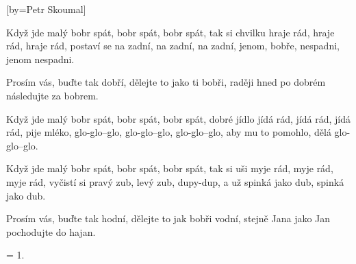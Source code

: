 [by={Petr Skoumal}]

\beginverse{}
Když jde malý bobr spát, bobr spát, bobr spát,
tak si chvilku hraje rád, hraje rád, hraje rád,
postaví se na zadní, na zadní, na zadní,
jenom, bobře, nespadni, jenom nespadni.
\endverse{}

\beginchorus{}
Prosím vás, buďte tak dobří, dělejte to jako ti bobři,
raději hned po dobrém následujte za bobrem.
\endchorus{}

\beginverse{}
Když jde malý bobr spát, bobr spát, bobr spát,
dobré jídlo jídá rád, jídá rád, jídá rád,
pije mléko, glo-glo--glo, glo-glo--glo, glo-glo--glo,
aby mu to pomohlo, dělá glo-glo--glo.
\endverse{}

\beginchorus{}
\phantom{}
\endchorus{}

\beginverse{}
Když jde malý bobr spát, bobr spát, bobr spát,
tak si uši myje rád, myje rád, myje rád,
vyčistí si pravý zub, levý zub, dupy-dup,
a už spinká jako dub, spinká jako dub.
\endverse{}

\beginchorus{}
Prosím vás, buďte tak hodní, dělejte to jak bobři vodní,
stejně Jana jako Jan pochodujte do hajan.
\endchorus{}

\beginverse{}
= 1.
\endverse{}

\beginchorus{}
\phantom{}
\endchorus{}

\endsong{}
